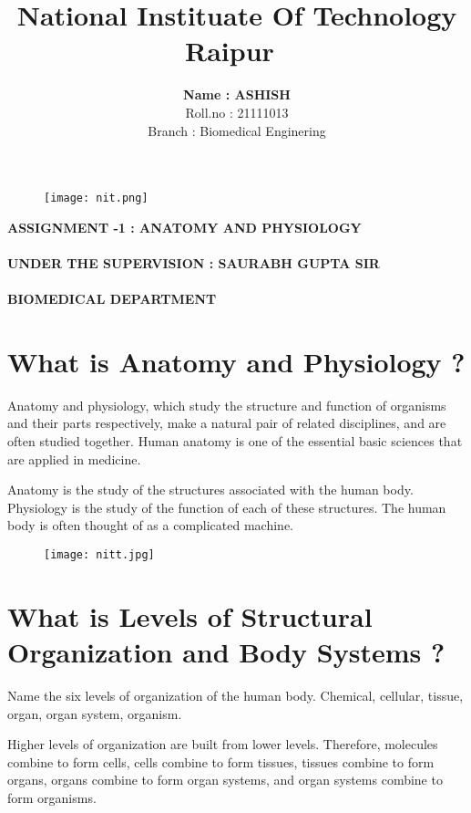 \documentclass[12pt]{article}
\title{\textbf{National Instituate Of  Technology  Raipur}\ }
\author{\textbf{Name : ASHISH}\\ Roll.no : 21111013\\Branch : Biomedical Enginering \\}
\begin{document}
\maketitle
\begin{figure}[h]
\centering
\texttt{[image: nit.png]}

\end{figure}

\textbf{ASSIGNMENT -1  : ANATOMY AND PHYSIOLOGY  }\\\\

\textbf {UNDER THE SUPERVISION : SAURABH GUPTA SIR }\\\\

\textbf{       BIOMEDICAL DEPARTMENT}




\section{What is  Anatomy and Physiology ?}

Anatomy and physiology, which study the structure and function of organisms and their parts respectively, make a natural pair of related disciplines, and are often studied together. Human anatomy is one of the essential basic sciences that are applied in medicine.


Anatomy is the study of the structures associated with the human body. Physiology is the study of the function of each of these structures. The human body is often thought of as a complicated machine.

\begin{figure}[h]
\centering
\texttt{[image: nitt.jpg]}

\end{figure}

\section{What is Levels of Structural Organization and Body Systems ?}
Name the six levels of organization of the human body. Chemical, cellular, tissue, organ, organ system, organism.


Higher levels of organization are built from lower levels. Therefore, molecules combine to form cells, cells combine to form tissues, tissues combine to form organs, organs combine to form organ systems, and organ systems combine to form organisms. 
\end{document}
